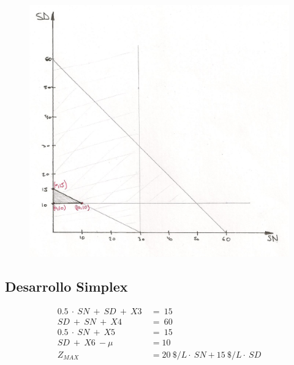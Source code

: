 \documentclass[a4paper,10pt]{article}
\begin{document}
\begin{figure}[ht!]
\centering
\includegraphics[scale=0.6]{graficoModelos.jpg}
\end{figure}

\subsection{Desarrollo Simplex}

\begin{align*}
0.5\ \cdot \ SN\ +\ SD \ +\ X3 \ &= \ 15  \\
SD\ +\ SN \ +\ X4 \ &= \ 60  \\
0.5\ \cdot \ SN\ +\ X5 \ &= \ 15  \\
SD \ +\ X6 \ - \mu \ &= 10  \\
Z_{MAX} &= 20 \ \$/L \cdot \ SN + 15 \ \$/L \cdot \ SD \\
\end{align*}
\end{document}
